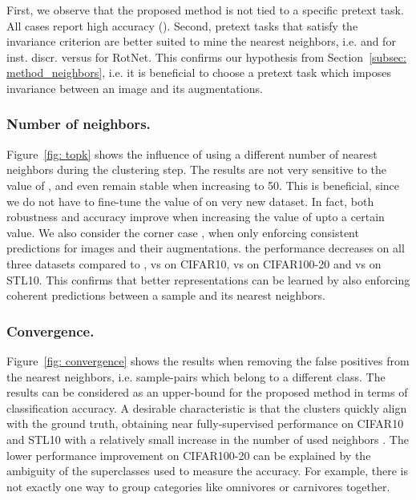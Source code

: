 \documentclass[runningheads]{llncs}
\begin{document}
First, we observe that the proposed method is not tied to a specific pretext task. All cases report high accuracy (). Second, pretext tasks that satisfy the invariance criterion are better suited to mine the nearest neighbors, i.e.  and  for inst. discr. versus  for RotNet. This confirms our hypothesis from Section~\ref{subsec: method_neighbors}, i.e. it is beneficial to choose a pretext task which imposes invariance between an image and its augmentations. 

\subsubsection{Number of neighbors.}
Figure~\ref{fig: topk} shows the influence of using a different number of nearest neighbors  during the clustering step. The results are not very sensitive to the value of , and even remain stable when increasing  to 50. This is beneficial, since we do not have to fine-tune the value of  on very new dataset. In fact, both robustness and accuracy improve when increasing the value of  upto a certain value. We also consider the corner case , when only enforcing consistent predictions for images and their augmentations. the performance decreases on all three datasets compared to ,  vs  on CIFAR10,  vs  on CIFAR100-20 and  vs  on STL10. This confirms that better representations can be learned by also enforcing coherent predictions between a sample and its nearest neighbors. 

\subsubsection{Convergence.}
Figure~\ref{fig: convergence} shows the results when removing the false positives from the nearest neighbors, i.e. sample-pairs which belong to a different class. The results can be considered as an upper-bound for the proposed method in terms of classification accuracy. A desirable characteristic is that the clusters quickly align with the ground truth, obtaining near fully-supervised performance on CIFAR10 and STL10 with a relatively small increase in the number of used neighbors . The lower performance improvement on CIFAR100-20 can be explained by the ambiguity of the superclasses used to measure the accuracy. For example, there is not exactly one way to group categories like omnivores or carnivores together. 
\end{document}
